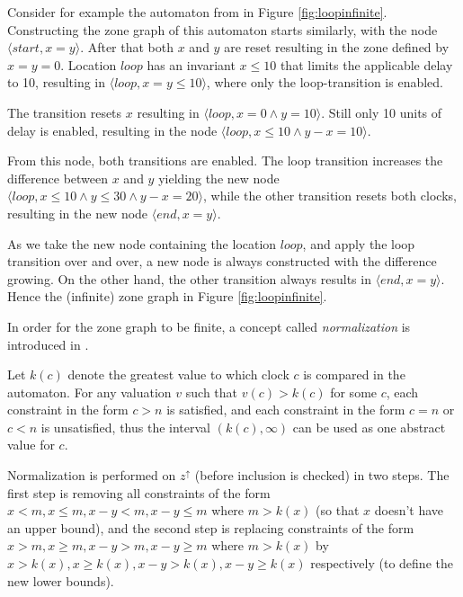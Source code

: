 \begin{example}

Consider for example the automaton from \cite{bengtsson2004timed} in Figure \ref{fig:loopinfinite}.
Constructing the zone graph of this automaton starts similarly, with the node $\langle start, x=y \rangle$. After that both $x$ and $y$ are reset resulting in the zone defined by $x=y=0$. Location $loop$ has an invariant $x \leq 10$ that limits the applicable delay to 10, resulting in $\langle loop, x=y \leq 10 \rangle$, where only the loop-transition is enabled.

The transition resets $x$ resulting in $\langle loop, x=0 \wedge y=10 \rangle$. Still only 10 units of delay is enabled, resulting in the node $\langle loop, x \leq 10 \wedge y-x=10 \rangle$.

From this node, both transitions are enabled. The loop transition increases the difference between $x$ and $y$ yielding the new node $\langle loop, x \leq 10 \wedge y \leq 30 \wedge y-x=20 \rangle$, while the other transition resets both clocks, resulting in the new node $\langle end, x=y \rangle$.

As we take the new node containing the location $loop$, and apply the loop transition over and over, a new node is always constructed with the difference growing. On the other hand, the other transition always results in $\langle end, x=y \rangle$.
Hence the (infinite) zone graph in Figure \ref{fig:loopinfinite}.

\end{example}

In order for the zone graph to be finite, a concept called \emph{normalization} is introduced in \cite{bengtsson2004timed}.

Let $k(c)$ denote the greatest value to which clock $c$ is compared in the automaton.
For any valuation $v$ such that $v(c)>k(c)$ for some $c$, each constraint in the form $c > n$ is satisfied, and each constraint in the form $c = n$ or $c < n$ is unsatisfied, thus the interval $(k(c),\infty)$ can be used as one abstract value for $c$. 

Normalization is performed on $z^\uparrow$ (before inclusion is checked) in two steps. The first step is removing all constraints of the form $x < m, x \leq m, x-y <m, x-y\leq m$ where $m>k(x)$ (so that $x$ doesn't have an upper bound), and the second step is replacing constraints of the form $x > m, x \geq m, x-y >m, x-y\geq m$ where $m>k(x)$ by $x > k(x), x \geq k(x), x-y >k(x), x-y\geq k(x)$ respectively (to define the new lower bounds).

